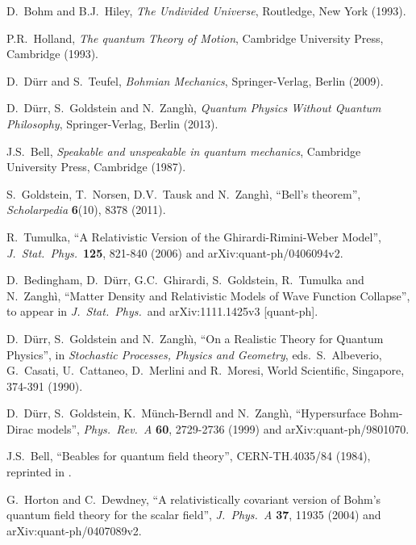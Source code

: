 \documentclass[12pt]{article}
\begin{document}
\begin{thebibliography}{10}

{D.\ Bohm and B.J.\ Hiley, {\em The Undivided Universe}, Routledge, New York
  (1993).}

{P.R.\ Holland, {\em The quantum Theory of Motion}, Cambridge University Press,
  Cambridge (1993).}

{D.\ D\"urr and S.\ Teufel, {\em Bohmian Mechanics}, Springer-Verlag, Berlin
  (2009).}

{D.\ D\"urr, S.\ Goldstein and N.\ Zangh\`\i, {\em Quantum Physics Without
  Quantum Philosophy}, Springer-Verlag, Berlin (2013).}

{J.S.\ Bell, {\em Speakable and unspeakable in quantum mechanics}, Cambridge
  University Press, Cambridge (1987).}

{S.\ Goldstein, T.\ Norsen, D.V.\ Tausk and N.\ Zangh\`i, ``Bell's theorem'',
  {\em Scholarpedia} {\bf 6}(10), 8378 (2011).}

{R.\ Tumulka, ``A Relativistic Version of the Ghirardi-Rimini-Weber Model'',
  {\em J.\ Stat.\ Phys.}\ {\bf 125}, 821-840 (2006) and
  arXiv:quant-ph/0406094v2.}

{D.\ Bedingham, D.\ D\"urr, G.C.\ Ghirardi, S.\ Goldstein, R.\ Tumulka and N.\
  Zangh\`i, ``Matter Density and Relativistic Models of Wave Function
  Collapse'', to appear in {\em J.\ Stat.\ Phys.}\  and arXiv:1111.1425v3 [quant-ph].}


{D.\ D\"urr, S.\ Goldstein and N.\ Zangh\`\i, ``On a Realistic Theory for Quantum Physics'', in {\em Stochastic Processes,
  Physics and Geometry}, eds.\ S.\ Albeverio, G.\ Casati, U.\ Cattaneo, D.\
  Merlini and R.\ Moresi, World Scientific, Singapore, 374-391 (1990).}

\bibitem{duerr99}
{D.\ D\"urr, S.\ Goldstein, K.\ M\"unch-Berndl and N.\ Zangh\`\i,
  ``Hypersurface Bohm-Dirac models'', {\em Phys.\ Rev.\ A} {\bf 60}, 2729-2736
  (1999) and arXiv:quant-ph/9801070.}


{J.S.\ Bell, ``Beables for quantum field theory'', CERN-TH.4035/84 (1984), reprinted in \cite{bell87a}.}


{G.\ Horton and C.\ Dewdney, ``A relativistically covariant version of Bohm's
  quantum field theory for the scalar field'', {\em J.\ Phys.\ A} {\bf 37},
  11935 (2004) and arXiv:quant-ph/0407089v2.}


\end{thebibliography}
\end{document}
